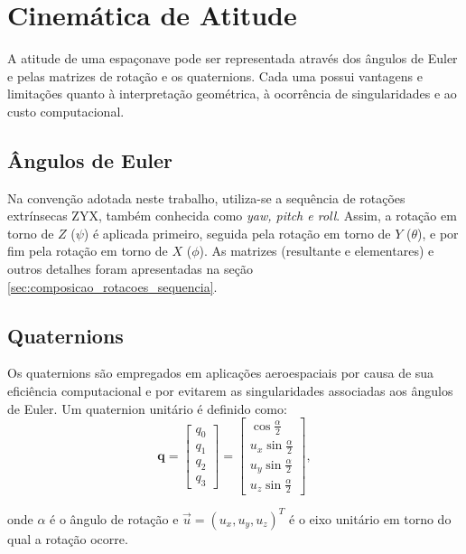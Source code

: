 \section{Cinemática de Atitude}
A atitude de uma espaçonave pode ser representada através dos ângulos de Euler e pelas matrizes de rotação e os quaternions.
Cada uma possui vantagens e limitações quanto à interpretação geométrica, à ocorrência de singularidades e ao custo computacional.

\subsection{Ângulos de Euler}
Na convenção adotada neste trabalho, utiliza-se a sequência de rotações extrínsecas ZYX, também conhecida como \emph{yaw, pitch e roll}.
Assim, a rotação em torno de $Z$ ($\psi$) é aplicada primeiro, seguida pela rotação em torno de $Y$ ($\theta$), e por fim pela rotação em torno de $X$ ($\phi$).
As matrizes (resultante e elementares) e outros detalhes foram apresentadas na seção \eqref{sec:composicao_rotacoes_sequencia}.

\subsection{Quaternions}
\label{sec:Quaternions}
Os quaternions são empregados em aplicações aeroespaciais por causa de sua eficiência computacional e por evitarem as singularidades associadas aos ângulos de Euler.
Um quaternion unitário é definido como:
\begin{equation}
\mathbf{q} =
\begin{bmatrix}
q_0 \\ q_1 \\ q_2 \\ q_3
\end{bmatrix}
=
\begin{bmatrix}
\cos\frac{\alpha}{2} \\
u_x \sin\frac{\alpha}{2} \\
u_y \sin\frac{\alpha}{2} \\
u_z \sin\frac{\alpha}{2}
\end{bmatrix},
\end{equation}

onde $\alpha$ é o ângulo de rotação e $\vec{u} = (u_x,u_y,u_z)^T$ é o eixo unitário em torno do qual a rotação ocorre.

